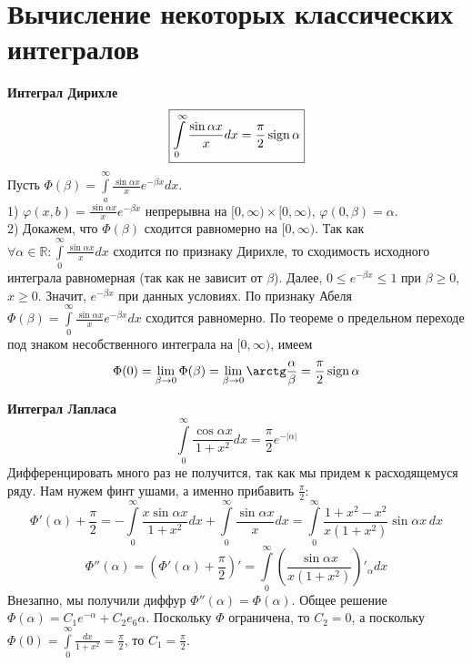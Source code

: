 \section{Вычисление некоторых классических интегралов}

\textbf{Интеграл Дирихле}
$$\boxed{
\int\limits_{0}^{\infty}\frac{\sin\alpha x}{x}dx=\frac{\pi}{2}\operatorname{sign}\alpha}$$
Пусть $\Phi(\beta)=\int\limits_{a}^{\infty}\frac{\sin\alpha x}{x}e^{
-\beta x}dx$.\\
1) $\varphi(x,b)=\frac{\sin\alpha x}{x}e^{-\beta x}$ непрерывна на 
$[0,\infty)\times [0,\infty)$, $\varphi(0,\beta)=\alpha$. \\
2) Докажем, что $\Phi(\beta)$ сходится равномерно на $[0,\infty)$.
Так как $\forall \alpha\in \mathbb{R}: \int\limits_{0}^{\infty}
\frac{\sin\alpha x}{x}dx$ сходится по признаку Дирихле, то сходимость
исходного интеграла равномерная (так как не зависит от $\beta$). 
Далее, $0\leqslant e^{-\beta x}\leqslant 1$ при $\beta\geqslant 0$,
$x\geqslant 0$. Значит, $e^{-\beta x}$ при данных условиях.
По признаку Абеля $\Phi(\beta)=\int\limits_{0}^{\infty}\frac{\sin\alpha x}{
x}e^{-\beta x}dx$ сходится равномерно. По теореме о предельном переходе под
знаком несобственного интеграла на $[0,\infty)$, имеем
$$\Phi(0)=\lim\limits_{\beta \to 0}\Phi(\beta)=\lim\limits_{\beta \to 0}
\arctg \frac{\alpha}{\beta}=\frac{\pi}{2}\sign\alpha$$

\textbf{Интеграл Лапласа}
$$\boxed{
    \int\limits_{0}^{\infty} \frac{\cos\alpha x}{1+x^2}dx=\frac{\pi}{2}
    e^{-|\alpha|}
}$$
Дифференцировать много раз не получится, так как мы придем к расходящемуся 
ряду. Нам нужем финт ушами, а именно прибавить $\frac{\pi}{2}$:
$$\Phi'(\alpha)+\frac{\pi}{2}=-\int\limits_{0}^{\infty} \frac{x\sin\alpha x}{
1+x^2}dx+\int\limits_{0}^{\infty} \frac{\sin\alpha x}{x}dx=
\int\limits_{0}^{\infty}\frac{1+x^2-x^2}{x(1+x^2)}\sin\alpha x\,dx$$
$$\Phi''(\alpha)=\left(\Phi'(\alpha)+\frac{\pi}{2}\right)'
=\int\limits_{0}^{\infty}
\left( \frac{\sin\alpha x}{x(1+x^2)}\right)'_\alpha dx$$
Внезапно, мы получили диффур $\Phi''(\alpha)=\Phi(\alpha)$. Общее решение
$\Phi(\alpha)=C_1e^{-\alpha}+C_2e_6{\alpha}$. Поскольку $\Phi$ ограничена,
то  $C_2=0$, а поскольку $\Phi(0)=\int\limits_{0}^{\infty}\frac{dx}{1+x^2}=
\frac{\pi}{2}$, то $C_1=\frac{\pi}{2}$. 





